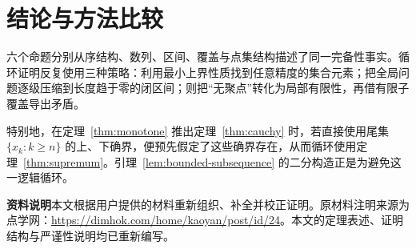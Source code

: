 \documentclass[UTF8,12pt,a4paper,fontset=fandol,oneside]{ctexart}
\begin{document}
\section{结论与方法比较}

六个命题分别从序结构、数列、区间、覆盖与点集结构描述了同一完备性事实。循环证明反复使用三种策略：利用最小上界性质找到任意精度的集合元素；把全局问题逐级压缩到长度趋于零的闭区间；则把“无聚点”转化为局部有限性，再借有限子覆盖导出矛盾。

特别地，在定理~\ref{thm:monotone} 推出定理~\ref{thm:cauchy} 时，若直接使用尾集 $\{x_k:k\geq n\}$ 的上、下确界，便预先假定了这些确界存在，从而循环使用定理~\ref{thm:supremum}。引理~\ref{lem:bounded-subsequence} 的二分构造正是为避免这一逻辑循环。

\noindent\textbf{资料说明}\quad 本文根据用户提供的材料重新组织、补全并校正证明。原材料注明来源为点学网：\url{https://dimhok.com/home/kaoyan/post/id/24}。本文的定理表述、证明结构与严谨性说明均已重新编写。
\end{document}
